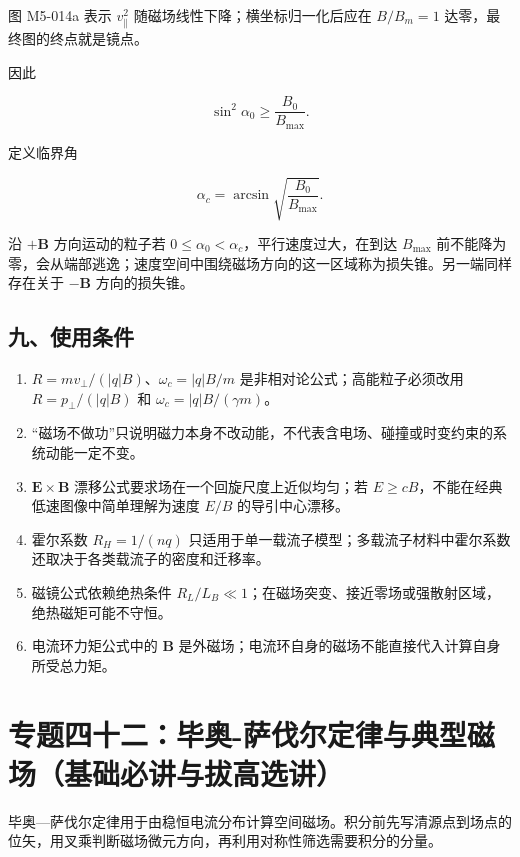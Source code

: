 图 M5-014a 表示 \(v_{\parallel}^2\) 随磁场线性下降；横坐标归一化后应在
\(B/B_m=1\) 达零，最终图的终点就是镜点。

因此

\[
\boxed{
\sin^2\alpha_0\ge\frac{B_0}{B_{\max}}
}.
\]

定义临界角

\[
\alpha_c=\arcsin\sqrt{\frac{B_0}{B_{\max}}}.
\]

沿 \(+\mathbf B\) 方向运动的粒子若
\(0\le\alpha_0<\alpha_c\)，平行速度过大，在到达 \(B_{\max}\)
前不能降为零，会从端部逃逸；速度空间中围绕磁场方向的这一区域称为损失锥。另一端同样存在关于
\(-\mathbf B\) 方向的损失锥。

\subsection{九、使用条件}\label{m5:ux4e5dux4f7fux7528ux6761ux4ef6}

\begin{enumerate}
\def\labelenumi{\arabic{enumi}.}
\tightlist
\item
  \(R=mv_{\perp}/(|q|B)\)、\(\omega_c=|q|B/m\)
  是非相对论公式；高能粒子必须改用 \(R=p_{\perp}/(|q|B)\) 和
  \(\omega_c=|q|B/(\gamma m)\)。
\item
  ``磁场不做功''只说明磁力本身不改动能，不代表含电场、碰撞或时变约束的系统动能一定不变。
\item
  \(\mathbf E\times\mathbf B\)
  漂移公式要求场在一个回旋尺度上近似均匀；若
  \(E\ge cB\)，不能在经典低速图像中简单理解为速度 \(E/B\)
  的导引中心漂移。
\item
  霍尔系数 \(R_H=1/(nq)\)
  只适用于单一载流子模型；多载流子材料中霍尔系数还取决于各类载流子的密度和迁移率。
\item
  磁镜公式依赖绝热条件
  \(R_L/L_B\ll1\)；在磁场突变、接近零场或强散射区域，绝热磁矩可能不守恒。
\item
  电流环力矩公式中的 \(\mathbf B\)
  是外磁场；电流环自身的磁场不能直接代入计算自身所受总力矩。
\end{enumerate}

\section{专题四十二：毕奥-萨伐尔定律与典型磁场（基础必讲与拔高选讲）}\label{m5:ux4e13ux9898ux56dbux5341ux4e8cux6bd5ux5965-ux8428ux4f10ux5c14ux5b9aux5f8bux4e0eux5178ux578bux78c1ux573aux57faux7840ux5fc5ux8bb2ux4e0eux62d4ux9ad8ux9009ux8bb2}

毕奥---萨伐尔定律用于由稳恒电流分布计算空间磁场。积分前先写清源点到场点的位矢，用叉乘判断磁场微元方向，再利用对称性筛选需要积分的分量。

